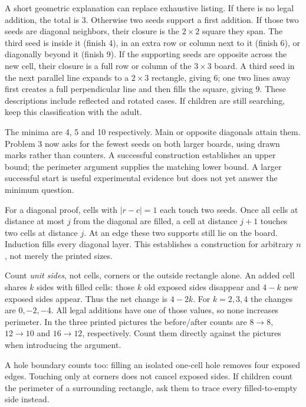 A short geometric explanation can replace exhaustive listing. If there is no legal addition, the total is 3. Otherwise two seeds support a first addition. If those two seeds are diagonal neighbors, their closure is the $2\times2$ square they span. The third seed is inside it (finish 4), in an extra row or column next to it (finish 6), or diagonally beyond it (finish 9). If the supporting seeds are opposite across the new cell, their closure is a full row or column of the $3\times3$ board. A third seed in the next parallel line expands to a $2\times3$ rectangle, giving 6; one two lines away first creates a full perpendicular line and then fills the square, giving 9. These descriptions include reflected and rotated cases. If children are still searching, keep this classification with the adult.

The minima are 4, 5 and 10 respectively. Main or opposite diagonals attain them. Problem 3 now asks for the fewest seeds on both larger boards, using drawn marks rather than counters. A successful construction establishes an upper bound; the perimeter argument supplies the matching lower bound. A larger successful start is useful experimental evidence but does not yet answer the minimum question.

For a diagonal proof, cells with $|r-c|=1$ each touch two seeds. Once all cells at distance at most $j$ from the diagonal are filled, a cell at distance $j+1$ touches two cells at distance $j$. At an edge these two supports still lie on the board. Induction fills every diagonal layer. This establishes a construction for arbitrary $n$, not merely the printed sizes.

Count \emph{unit sides}, not cells, corners or the outside rectangle alone. An added cell shares $k$ sides with filled cells: those $k$ old exposed sides disappear and $4-k$ new exposed sides appear. Thus the net change is $4-2k$. For $k=2,3,4$ the changes are $0,-2,-4$. All legal additions have one of those values, so none increases perimeter. In the three printed pictures the before/after counts are $8\to8$, $12\to10$ and $16\to12$, respectively. Count them directly against the pictures when introducing the argument.

A hole boundary counts too: filling an isolated one-cell hole removes four exposed edges. Touching only at corners does not cancel exposed sides. If children count the perimeter of a surrounding rectangle, ask them to trace every filled-to-empty side instead.

